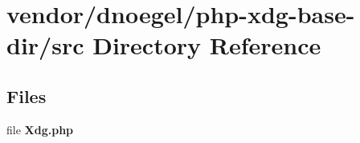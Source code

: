 \section{vendor/dnoegel/php-\/xdg-\/base-\/dir/src Directory Reference}
\label{dir_905cb61bfdf54c9805fcaf94ccdfca4c}
\subsection*{Files}
\begin{DoxyCompactItemize}
\item 
file {\bf Xdg.\+php}
\end{DoxyCompactItemize}
